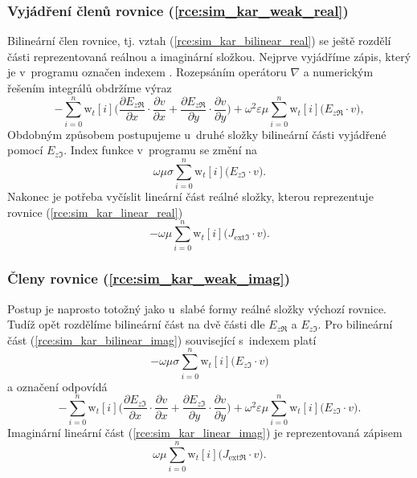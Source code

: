 \subsubsection*{Vyjádření členů rovnice (\ref{rce:sim_kar_weak_real})}
Bilineární člen rovnice, tj. vztah (\ref{rce:sim_kar_bilinear_real}) se ještě rozdělí části reprezentovaná reálnou a imaginární složkou. Nejprve vyjádříme zápis, který je v~programu označen indexem . Rozepsáním operátoru $\nabla$ a numerickým řešením integrálů obdržíme výraz
\begin{equation}
	-\sum_{i=0}^{n}\mathrm{w}_{t}[i]\bigg(\frac{\partial E_{z\Re}}{\partial x}\cdot \frac{\partial v}{\partial x} + \frac{\partial E_{z\Re}}{\partial y}\cdot \frac{\partial v}{\partial y} \bigg) + \omega^{2}\varepsilon\mu\sum_{i=0}^{n}\mathrm{w}_{t}[i]\bigg(E_{z\Re}\cdot v\bigg),
	\label{rce:sim_kar_weak_real_real_num} 
\end{equation}
Obdobným způsobem postupujeme u~druhé složky bilineární části vyjádřené pomocí $E_{z\Im}$. Index funkce v~programu se změní na 
\begin{equation}
 \omega\mu\sigma\sum_{i=0}^{n}\mathrm{w}_{t}[i]\bigg(E_{z\Im}\cdot v\bigg).
	\label{rce:sim_kar_weak_real_imag_num} 
\end{equation}
Nakonec je potřeba vyčíslit lineární část reálné složky, kterou reprezentuje rovnice (\ref{rce:sim_kar_linear_real})
\begin{equation}
 -\omega\mu\sum_{i=0}^{n}\mathrm{w}_{t}[i]\bigg(J_{\mathrm{ext}\Im}\cdot v\bigg).
	\label{rce:sim_kar_linear_real_num} 
\end{equation}


\subsubsection*{Členy rovnice (\ref{rce:sim_kar_weak_imag})}
Postup je naprosto totožný jako u~slabé formy reálné složky výchozí rovnice. Tudíž opět rozdělíme bilineární část na dvě části dle $E_{z\Re}$ a $E_{z\Im}$. Pro bilineární část (\ref{rce:sim_kar_bilinear_imag}) související s~indexem  platí
\begin{equation}
 -\omega\mu\sigma\sum_{i=0}^{n}\mathrm{w}_{t}[i]\bigg(E_{z\Im}\cdot v\bigg)
	\label{rce:sim_kar_weak_imag_real_num} 
\end{equation}
a označení  odpovídá
\begin{equation}
	-\sum_{i=0}^{n}\mathrm{w}_{t}[i]\bigg(\frac{\partial E_{z\Im}}{\partial x}\cdot \frac{\partial v}{\partial x} + \frac{\partial E_{z\Im}}{\partial y}\cdot \frac{\partial v}{\partial y} \bigg) + \omega^{2}\varepsilon\mu\sum_{i=0}^{n}\mathrm{w}_{t}[i]\bigg(E_{z\Im}\cdot v\bigg).
	\label{rce:sim_kar_weak_imag_imag_num} 
\end{equation}
Imaginární lineární část (\ref{rce:sim_kar_linear_imag}) je reprezentovaná zápisem
\begin{equation}
 \omega\mu\sum_{i=0}^{n}\mathrm{w}_{t}[i]\bigg(J_{\mathrm{ext}\Re}\cdot v\bigg).
	\label{rce:sim_kar_linear_imag_num} 
\end{equation}

